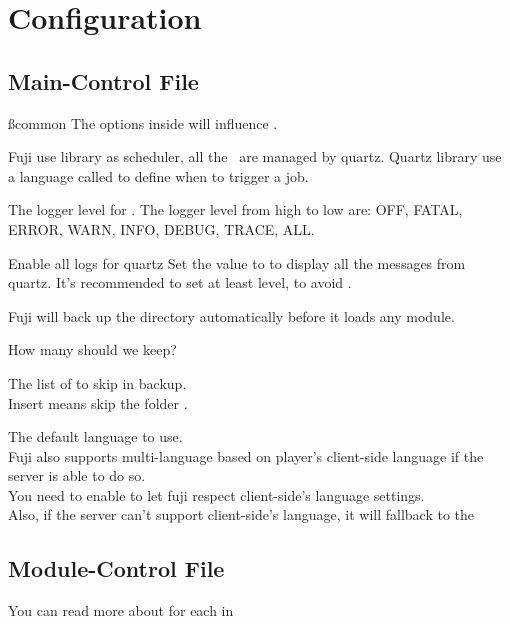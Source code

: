 \chapter{Configuration}\label{ch:configuration}
\section{Main-Control File}

\ss{common}
The  options inside  will influence .

Fuji use  library as scheduler, all the~ are managed by quartz.
Quartz library use a language called  to define when to trigger a job.

The logger level for .
The logger level from high to low are: OFF, FATAL, ERROR, WARN, INFO, DEBUG, TRACE, ALL.

\begin{example}{Enable all logs for quartz}
    Set the value to  to display all the messages from quartz.
    It's recommended to set at least  level, to avoid .
\end{example}

Fuji will back up the  directory automatically before it loads any module.

How many  should we keep?

The list of  to skip in backup.
\\
Insert  means skip the folder .

The default language to use.
\\
Fuji also supports multi-language based on player's client-side language if the server is able to do so.
\\
You need to enable  to let fuji respect client-side's language settings.
\\
Also, if the server can't support client-side's language, it will fallback to the 



\clearpage
\section{Module-Control File}
You can read more about  for each  in 